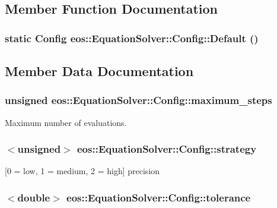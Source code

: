 \subsection{Member Function Documentation}
\hypertarget{structeos_1_1EquationSolver_1_1Config_a09146644b138f64029be17f8749fc237}{
\subsubsection[{Default}]{\setlength{\rightskip}{0pt plus 5cm}static {\bf Config} eos::EquationSolver::Config::Default ()}}
\label{structeos_1_1EquationSolver_1_1Config_a09146644b138f64029be17f8749fc237}


\subsection{Member Data Documentation}
\hypertarget{structeos_1_1EquationSolver_1_1Config_ae7c9a2c51f8669b27669cde1a64af2b0}{
\subsubsection[{maximum\_\-steps}]{\setlength{\rightskip}{0pt plus 5cm}unsigned {\bf eos::EquationSolver::Config::maximum\_\-steps}}}
\label{structeos_1_1EquationSolver_1_1Config_ae7c9a2c51f8669b27669cde1a64af2b0}


Maximum number of evaluations. \hypertarget{structeos_1_1EquationSolver_1_1Config_af745d1f394c65f1176470aa42b1fdbc0}{
\subsubsection[{strategy}]{$<$unsigned$>$ {\bf eos::EquationSolver::Config::strategy}}}
\label{structeos_1_1EquationSolver_1_1Config_af745d1f394c65f1176470aa42b1fdbc0}


\mbox{[}0 = low, 1 = medium, 2 = high\mbox{]} precision \hypertarget{structeos_1_1EquationSolver_1_1Config_a8044943acf44d730c0e78226e1c30492}{
\subsubsection[{tolerance}]{$<$double$>$ {\bf eos::EquationSolver::Config::tolerance}}}
\label{structeos_1_1EquationSolver_1_1Config_a8044943acf44d730c0e78226e1c30492}


